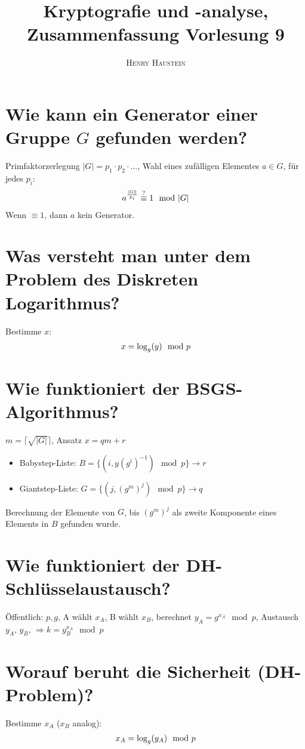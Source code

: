 \documentclass{article}
\title{\textbf{Kryptografie und -analyse, Zusammenfassung Vorlesung 9}}
\author{\textsc{Henry Haustein}}
\date{}
\begin{document}
	\maketitle
	
	\section*{Wie kann ein Generator einer Gruppe $G$ gefunden werden?}
	Primfaktorzerlegung $\vert G\vert = p_1\cdot p_2\cdot ...$, Wahl eines zufälligen Elementes $a\in G$, für jedes $p_i$:
	\begin{align}
		a^{\frac{\vert G\Vert}{p_i}} \overset{?}{\equiv} 1 \mod \vert G\vert \notag
	\end{align}
	Wenn $\equiv 1$, dann $a$ kein Generator.
	
	\section*{Was versteht man unter dem Problem des Diskreten Logarithmus?}
	Bestimme $x$:
	\begin{align}
		x = \log_g(y) \mod p \notag
	\end{align}
	
	\section*{Wie funktioniert der BSGS-Algorithmus?}
	$m = \lceil \sqrt{\vert G\vert}\rceil$, Ansatz $x=qm + r$
	\begin{itemize}
		\item Babystep-Liste: $B=\{(i,y(g^i)^{-1})\mod p\} \to r$
		\item Giantstep-Liste: $G=\{(j,(g^m)^j)\mod p\} \to q$
	\end{itemize}
	Berechnung der Elemente von $G$, bis $(g^m)^j$ als zweite Komponente eines Elements in $B$ gefunden wurde.
	
	\section*{Wie funktioniert der DH-Schlüsselaustausch?}
	Öffentlich: $p,g$, A wählt $x_A$, B wählt $x_B$, berechnet $y_A = g^{x_A}\mod p$, Austausch $y_A$, $y_B$, $\Rightarrow k = y_B^{x_A}\mod p$
	
	\section*{Worauf beruht die Sicherheit (DH-Problem)?}
	Bestimme $x_A$ ($x_B$ analog):
	\begin{align}
		x_A = \log_g(y_A) \mod p \notag
	\end{align}
	
\end{document}
